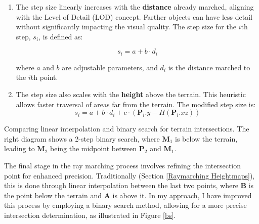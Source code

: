 \begin{enumerate}
    \item The step size linearly increases with the \textbf{distance} already marched, aligning with the Level of Detail (LOD) concept. Farther objects can have less detail without significantly impacting the visual quality. The step size for the $i$th step, $s_i$, is defined as:

   \begin{equation}
   s_{i} = a + b \cdot d_i
   \end{equation}
   
   where $a$ and $b$ are adjustable parameters, and $d_i$ is the distance marched to the $i$th point.

    \item The step size also scales with the \textbf{height} above the terrain. This heuristic allows faster traversal of areas far from the terrain. The modified step size is:
    \begin{equation}
    s_{i} = a + b \cdot d_{i} + c \cdot (\mathbf{P}_i.y - H(\mathbf{P}_i.xz))
    \end{equation}

\end{enumerate}

{Comparing linear interpolation and binary search for terrain intersections. The right diagram shows a 2-step binary search, where $\mathbf{M}_1$ is below the terrain, leading to $\mathbf{M}_2$ being the midpoint between $\mathbf{P}_2$ and $\mathbf{M}_1$. }{}

The final stage in the ray marching process involves refining the intersection point for enhanced precision. Traditionally (Section \ref{Raymarching Heightmaps}), this is done through linear interpolation between the last two points, where  $\mathbf{B}$ is the point below the terrain and $\mathbf{A}$ is above it. In my approach, I have improved this process by employing a binary search method, allowing for a more precise intersection determination, as illustrated in Figure \ref{bs}.


